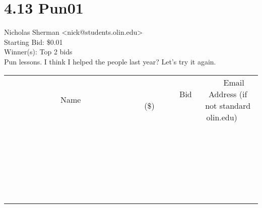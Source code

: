 \documentclass[11pt]{article}
\begin{document}
					\section*{4.13 Pun01}
					Nicholas Sherman <nick@students.olin.edu> \\
					Starting Bid: \$0.01 \\
					Winner(s): Top 2 bids \\
					Pun lessons. I think I helped the people last year? Let's try it again. \\
					[6ex]
					\begin{tabular}{c c c}
						~~~~~~~~~~~~~Name~~~~~~~~~~~~~ & ~~~~~~~~~Bid (\$)~~~~~~~~~ & ~~~Email Address (if not standard olin.edu)~~~ \\
				
 & & \\
\hline
 & & \\
\hline
 & & \\
\hline
 & & \\
\hline
 & & \\
\hline
 & & \\
\hline
 & & \\
\hline
 & & \\
\hline
 & & \\
\hline
 & & \\
\hline
 & & \\
\hline
 & & \\
\hline
 & & \\
\hline
 & & \\
\hline
 & & \\
\hline
 & & \\
\hline
 & & \\
\hline
 & & \\
\hline
 & & \\
\hline
 & & \\
\hline
 & & \\
\hline
 & & \\
\hline
 & & \\
\hline
 & & \\
\hline
 & & \\
\hline
 & & \\
\hline
					\end{tabular}
					\clearpage
				
\end{document}
